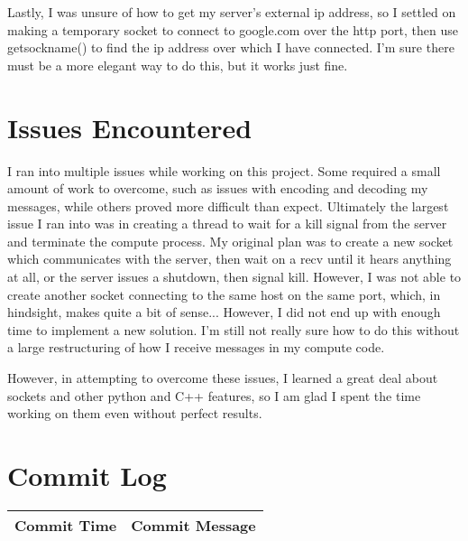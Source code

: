 \documentclass[letterpaper,10pt,twocolumn,titlepage]{article}
\begin{document}
Lastly, I was unsure of how to get my server's external ip address, so I settled
on making a temporary socket to connect to google.com over the http port, then
use getsockname() to find the ip address over which I have connected. I'm sure there
must be a more elegant way to do this, but it works just fine. 

\section{Issues Encountered}
I ran into multiple issues while working on this project. Some required a small amount
of work to overcome, such as issues with encoding and decoding my messages, while others
proved more difficult than expect. Ultimately the largest issue I ran into was in creating
a thread to wait for a kill signal from the server and terminate the compute process.
My original plan was to create a new socket which communicates with the server, then wait
on a recv until it hears anything at all, or the server issues a shutdown, then signal kill.
However, I was not able to create another socket connecting to the same host on the same port,
which, in hindsight, makes quite a bit of sense... However, I did not end up with enough
time to implement a new solution. I'm still not really sure how to do this without a large
restructuring of how I receive messages in my compute code.

However, in attempting to overcome these issues, I learned a great deal about sockets and 
other python and C++ features, so I am glad I spent the time working on them even without
perfect results.

\vfill\break

\section{Commit Log}

\begin{tabular}{ | p{3cm} | p{5.5cm} | }
	\hline
	Commit Time & Commit Message \\ \hline
	
\end{tabular}


\newpage
\newpage
\clearpage
\newpage
\clearpage
\clearpage
\newpage
\fancyhead{}
\end{document}
